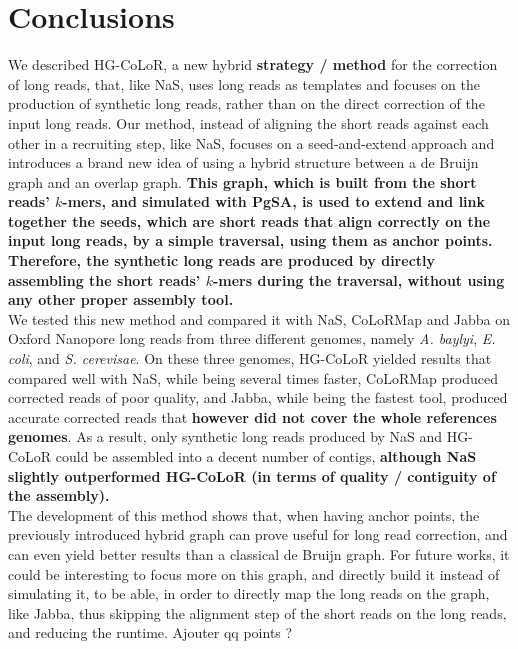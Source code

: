 \documentclass[long, final]{jobim2017}
\begin{document}
\indent \blindtext \blindtext \blindtext \blindtext

\section{Conclusions}
\label{sec:conclusions}

We described HG-CoLoR, a new hybrid \textbf{strategy / method} for the correction of long reads, that, like NaS, uses long reads as templates and focuses on the production of synthetic long reads, rather than on the direct correction of the input long reads. Our method, instead of aligning the short reads against each other in a recruiting step, like NaS, focuses on a seed-and-extend approach and introduces a brand new idea of using a hybrid structure between a de Bruijn graph and an overlap graph. \textbf{This graph, which is built from the short reads' $k$-mers, and simulated with PgSA, is used to extend and link together the seeds, which are short reads that align correctly on the input long reads, by a simple traversal, using them as anchor points. Therefore, the synthetic long reads are produced by directly assembling the short reads' $k$-mers during the traversal, without using any other proper assembly tool.} \\
\indent We tested this new method and compared it with NaS, CoLoRMap and Jabba on Oxford Nanopore long reads from three different genomes, namely \emph{A. baylyi}, \emph{E. coli}, and \emph{S. cerevisae}. On these three genomes, HG-CoLoR yielded results that compared well with NaS, while being several times faster, CoLoRMap produced corrected reads of poor quality, and Jabba, while being the fastest tool, produced accurate corrected reads that \textbf{however did not cover the whole references genomes}. As a result, only synthetic long reads produced by NaS and HG-CoLoR could be assembled into a decent number of contigs, \textbf{although NaS slightly outperformed HG-CoLoR (in terms of quality / contiguity of the assembly).} \\
\indent The development of this method shows that, when having anchor points, the previously introduced hybrid graph can prove useful for long read correction, and can even yield better results than a classical de Bruijn graph. For future works, it could be interesting to focus more on this graph, and directly build it instead of simulating it, to be able, in order to directly map the long reads on the graph, like Jabba, thus skipping the alignment step of the short reads on the long reads, and reducing the runtime. Ajouter qq points ?
\end{document}
